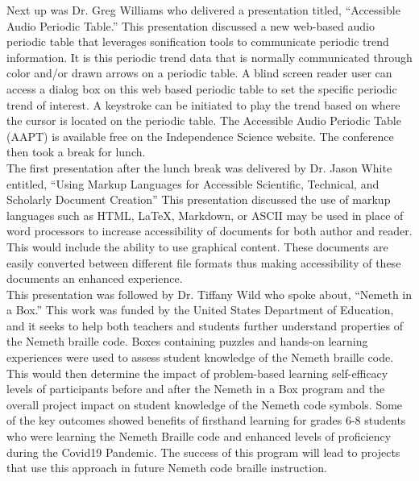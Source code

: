 \documentclass[11pt]{sig-alternate}
\begin{document}
\begin{large}
Next up was Dr. Greg Williams who delivered a presentation titled, “Accessible Audio Periodic Table.” This presentation discussed a new web-based audio periodic table that leverages sonification tools to communicate periodic trend information. It is this periodic trend data that is normally communicated through color and/or drawn arrows on a periodic table. A blind screen reader user can access a dialog box on this web based periodic table to set the specific periodic trend of interest. A keystroke can be initiated to play the trend based on where the cursor is located on the periodic table. The Accessible Audio Periodic Table (AAPT) is available free on the Independence Science website. The conference then took a break for lunch.\\

The first presentation after the lunch break was delivered by Dr. Jason White entitled, “Using Markup Languages for Accessible Scientific, Technical, and Scholarly Document Creation” This presentation discussed the use of markup languages such as HTML, LaTeX, Markdown, or ASCII may be used in place of word processors to increase accessibility of documents for both author and reader. This would include the ability to use graphical content. These documents are easily converted between different file formats thus making accessibility of these documents an enhanced experience.\\

This presentation was followed by Dr. Tiffany Wild who spoke about, “Nemeth in a Box.” This work was funded by the United States Department of Education, and it seeks to help both teachers and students further understand properties of the Nemeth braille code. Boxes containing puzzles and hands-on learning experiences were used to assess student knowledge of the Nemeth braille code. This would then determine the impact of problem-based learning self-efficacy levels of participants before and after the Nemeth in a Box program and the overall project impact on student knowledge of the Nemeth code symbols. Some of the key outcomes showed benefits of firsthand learning for grades 6-8 students who were learning the Nemeth Braille code and enhanced levels of proficiency during the Covid19 Pandemic. The success of this program will lead to projects that use this approach in future Nemeth code braille instruction.\\


\end{large}
\end{document}

